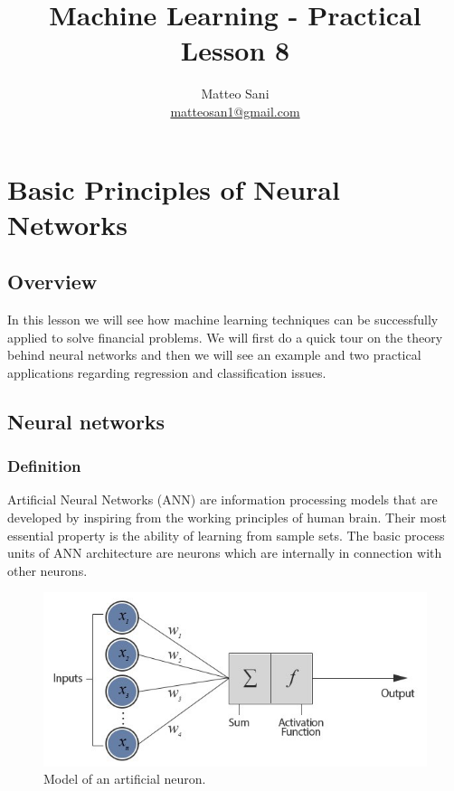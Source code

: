 \documentclass[11pt]{article}
\title{Machine Learning - Practical Lesson 8}
\author{Matteo Sani\\ \href{mailto:matteosan1@gmail.com}{matteosan1@gmail.com}}
\begin{document}
    
    \maketitle
    
    

    
    \hypertarget{neural-network---practical-lesson-8}{%
\section{Basic Principles of Neural Networks}\label{neural-network---practical-lesson-8}}

\hypertarget{overview}{%
\subsection{Overview}\label{overview}}

In this lesson we will see how machine learning techniques can be
successfully applied to solve financial problems. We will first do a
quick tour on the theory behind neural networks and then we will see an
example and two practical applications regarding regression and
classification issues.

\hypertarget{neural-networks}{%
\subsection{Neural networks}\label{neural-networks}}

\hypertarget{definition}{%
\subsubsection{Definition}\label{definition}}

Artificial Neural Networks (ANN) are information processing models that
are developed by inspiring from the working principles of human brain.
Their most essential property is the ability of learning from sample
sets. The basic process units of ANN architecture are neurons which are
internally in connection with other neurons.

\begin{figure}
\centering
\includegraphics{neuron.jpeg}
\caption{Model of an artificial neuron.}
\end{figure}
\end{document}
